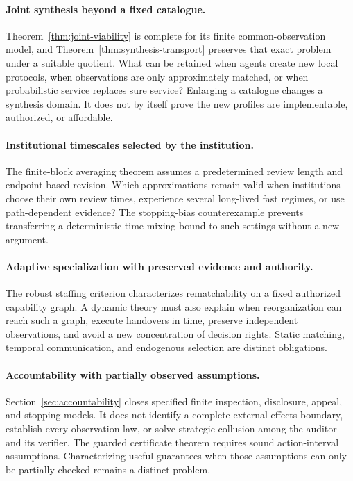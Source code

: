 \documentclass[11pt,letterpaper]{article}
\theoremstyle{plain}
\theoremstyle{definition}
\theoremstyle{remark}
\begin{document}
\paragraph{Joint synthesis beyond a fixed catalogue.}
Theorem~\ref{thm:joint-viability} is complete for its finite common-observation model, and Theorem~\ref{thm:synthesis-transport} preserves that exact problem under a suitable quotient. What can be retained when agents create new local protocols, when observations are only approximately matched, or when probabilistic service replaces sure service? Enlarging a catalogue changes a synthesis domain. It does not by itself prove the new profiles are implementable, authorized, or affordable.

\paragraph{Institutional timescales selected by the institution.}
The finite-block averaging theorem assumes a predetermined review length and endpoint-based revision. Which approximations remain valid when institutions choose their own review times, experience several long-lived fast regimes, or use path-dependent evidence? The stopping-bias counterexample prevents transferring a deterministic-time mixing bound to such settings without a new argument.

\paragraph{Adaptive specialization with preserved evidence and authority.}
The robust staffing criterion characterizes rematchability on a fixed authorized capability graph. A dynamic theory must also explain when reorganization can reach such a graph, execute handovers in time, preserve independent observations, and avoid a new concentration of decision rights. Static matching, temporal communication, and endogenous selection are distinct obligations.

\paragraph{Accountability with partially observed assumptions.}
Section~\ref{sec:accountability} closes specified finite inspection, disclosure, appeal, and stopping models. It does not identify a complete external-effects boundary, establish every observation law, or solve strategic collusion among the auditor and its verifier. The guarded certificate theorem requires sound action-interval assumptions. Characterizing useful guarantees when those assumptions can only be partially checked remains a distinct problem.
\end{document}
